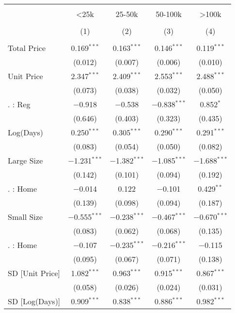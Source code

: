 
\begin{table}[!htbp] \centering 
  \caption{} 
  \label{} 
\begin{tabular}{@{\extracolsep{5pt}}lcccc} 
\\[-1.8ex]\hline 
\hline \\[-1.8ex] 
 & <25k & 25-50k & 50-100k & >100k \\ 
\\[-1.8ex] & (1) & (2) & (3) & (4)\\ 
\hline \\[-1.8ex] 
 Total Price & 0.169$^{***}$ & 0.163$^{***}$ & 0.146$^{***}$ & 0.119$^{***}$ \\ 
  & (0.012) & (0.007) & (0.006) & (0.010) \\ 
  Unit Price & 2.347$^{***}$ & 2.409$^{***}$ & 2.553$^{***}$ & 2.488$^{***}$ \\ 
  & (0.073) & (0.038) & (0.032) & (0.050) \\ 
  . : Reg & $-$0.918 & $-$0.538 & $-$0.838$^{***}$ & 0.852$^{*}$ \\ 
  & (0.646) & (0.403) & (0.323) & (0.435) \\ 
  Log(Days) & 0.250$^{***}$ & 0.305$^{***}$ & 0.290$^{***}$ & 0.291$^{***}$ \\ 
  & (0.083) & (0.054) & (0.050) & (0.082) \\ 
  Large Size & $-$1.231$^{***}$ & $-$1.382$^{***}$ & $-$1.085$^{***}$ & $-$1.688$^{***}$ \\ 
  & (0.142) & (0.101) & (0.094) & (0.192) \\ 
  . : Home & $-$0.014 & 0.122 & $-$0.101 & 0.429$^{**}$ \\ 
  & (0.139) & (0.098) & (0.094) & (0.187) \\ 
  Small Size & $-$0.555$^{***}$ & $-$0.238$^{***}$ & $-$0.467$^{***}$ & $-$0.670$^{***}$ \\ 
  & (0.083) & (0.062) & (0.068) & (0.135) \\ 
  . : Home & $-$0.107 & $-$0.235$^{***}$ & $-$0.216$^{***}$ & $-$0.115 \\ 
  & (0.095) & (0.067) & (0.071) & (0.138) \\ 
  SD [Unit Price] & 1.082$^{***}$ & 0.963$^{***}$ & 0.915$^{***}$ & 0.867$^{***}$ \\ 
  & (0.058) & (0.026) & (0.024) & (0.031) \\ 
  SD [Log(Days)] & 0.909$^{***}$ & 0.838$^{***}$ & 0.886$^{***}$ & 0.982$^{***}$ \\ 

\end{tabular}
\end{table}
